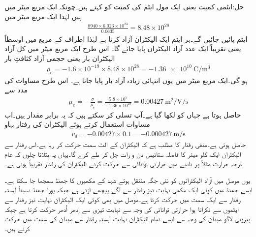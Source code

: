 حل:ایٹمی کمیت  یعنی ایک مول ایٹم کی کمیت کو کہتے ہیں۔چونکہ ایک مربع میٹر میں  ہیں لہٰذا ایک مربع میٹر میں
\begin{align*}
\frac{8940 \times 6.023 \times 10^{23}}{0.0635}=8.48 \times 10^{28}
\end{align*} 
ایٹم پائیں جائیں گے۔ہر ایٹم ایک الیکٹران آزاد کرتا ہے لہٰذا  اطراف کے مربع میں اوسطاً  یعنی تقریباً ایک عدد آزاد الیکٹران پایا جائے گا۔ اس طرح  ایک مربع میٹر میں کل آزاد الیکٹران بار یعنی حجمی آزاد کثافتِ بار
\begin{align}\label{مساوات_کپیسٹر_موصل_آزاد_بار_کثافت}
\rho_e=-1.6 \times 10^{-19} \times 8.48 \times 10^{28}=\SI{-1.36e10}{\coulomb \per \meter^3}
\end{align}
ہو گی۔ایک مربع میٹر میں یوں انتہائی زیادہ آزاد بار پایا جاتا ہے۔ اس طرح مساوات  کی مدد سے
\begin{align*}
\mu_e=-\frac{\sigma}{\rho_e}=\frac{5.8 \times 10^7}{-1.36 \times 10^{10}}=\SI{0.00427}{\meter \squared \per \volt \per \second}
\end{align*}
حاصل ہوتا ہے جہاں  کو  لکھا گیا ہے۔آپ تسلی کر سکتے ہیں کہ یہ برابر مقدار ہیں۔اب مساوات   استعمال کرتے ہوئے الیکٹران کی رفتار بہاو 
\begin{align*}
v_d = -0.00427 \times 0.1=\SI{-0.000427}{\meter \per \second}
\end{align*}
حاصل ہوتی ہے۔منفی رفتار کا مطلب ہے کہ الیکٹران  کے الٹ سمت حرکت کر رہا ہے۔اس رفتار سے الیکٹران ایک کلو میٹر کا فاصلہ ستائیس دن و رات چل کر طے کرے گا۔یہاں یہ بتلاتا چلوں کہ عام درجہ حرارت مثلاً  پر تانبے میں حرارتی توانائی سے حرکت کرتے الیکٹران کی رفتار تقریباً  ہوتی ہے۔

یوں موصل میں آزاد الیکٹرانوں کو نئی جگہ منتقل ہوتے  شہد کے مکھیوں کا جھنڈ  سمجھا جا سکتا ہے۔ایسے جھنڈ میں کوئی ایک مکھی نہایت تیز رفتار سے آگے پیچھے اڑتی ہے جبکہ پورا جھنڈ  نسبتاً آہستہ رفتار سے ایک سمت میں حرکت کرتا ہے۔موصل میں بھی کوئی ایک الیکٹران نہایت تیز رفتار سے ایٹموں سے ٹکراتا ہوا حرارتی توانائی کی وجہ سے  نہایت تیزی سے  اِدھر اُدھر حرکت کرتا ہے جبکہ بیرونی لاگو میدان کی وجہ سے ایسے تمام الیکٹران نہایت آہستہ رفتار سے میدان کی سمت میں حرکت کرتے ہیں۔

